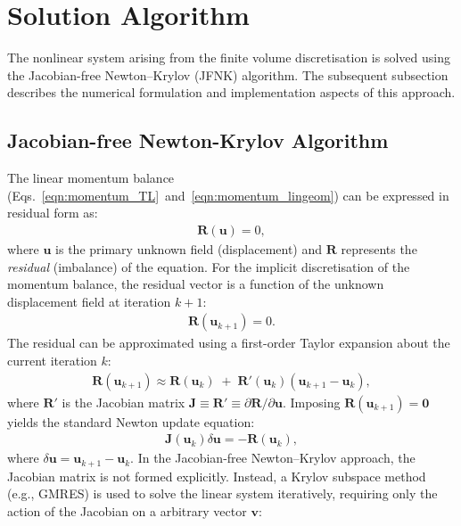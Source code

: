 \documentclass[sn-mathphys,Numbered]{sn-jnl}%
\newcommand{\bb}{\boldsymbol}
\begin{document}
\section{Solution Algorithm}
\label{sec:Sol_Alg}
%
%
The nonlinear system arising from the finite volume discretisation is solved using the Jacobian-free Newton–Krylov (JFNK) algorithm.
The subsequent subsection describes the numerical formulation and implementation aspects of this approach.
%
\subsection{Jacobian-free Newton-Krylov Algorithm}
\label{sec:JFNK_alg}
%
The linear momentum balance (Eqs.~\eqref{eqn:momentum_TL}~and~\eqref{eqn:momentum_lingeom}) can be expressed in residual form as:
%
\begin{eqnarray}
\bb{R}(\bb{u}) = 0,
\end{eqnarray}
%
where $\bb{u}$ is the primary unknown field (displacement) and $\bb{R}$ represents the \emph{residual} (imbalance) of the equation.
For the implicit discretisation of the momentum balance, the residual vector is a function of the unknown displacement field at iteration $k+1$:
%
\begin{eqnarray}
\bb{R}(\bb{u}_{k+1}) = 0.
\end{eqnarray}
%
The residual can be approximated using a first-order Taylor expansion about the current iteration $k$:
%
\begin{eqnarray}
 	\bb{R}(\bb{u}_{k+1}) \approx \bb{R}(\bb{u}_{k}) \;+\;  \bb{R}'(\bb{u}_{k}) (\bb{u}_{k+1} - \bb{u}_{k}),
\end{eqnarray}
%
where $\bb{R}'$ is the Jacobian matrix $\bb{J}\equiv\bb{R}'\equiv\partial \bb{R} / \partial \bb{u}$.
Imposing $\bb{R}(\bb{u}_{k+1}) = \bb{0}$ yields the standard Newton update equation:
%
\begin{eqnarray}
\bb{J}(\bb{u}_k) \delta \bb{u} = -\bb{R}(\bb{u}_k),
\end{eqnarray}
%
where $\delta \bb{u}=\bb{u}_{k+1} - \bb{u}_{k}$.
In the Jacobian-free Newton–Krylov approach, the Jacobian matrix is not formed explicitly.
Instead, a Krylov subspace method (e.g., GMRES) is used to solve the linear system iteratively, requiring only the action of the Jacobian on a arbitrary vector $\bb{v}$:
\end{document}
